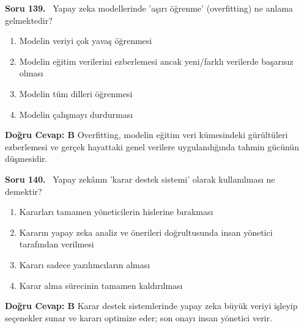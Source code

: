 \documentclass[11pt,a4paper,openany]{book}
\begin{document}
\needspace{5cm}
\vspace{8pt}
\noindent\textbf{\large\sffamily Soru 139.} \ Yapay zeka modellerinde 'aşırı öğrenme' (overfitting) ne anlama gelmektedir?
\begin{enumerate}[label=\Alph*), leftmargin=25pt, topsep=4pt, itemsep=2pt]
    \item Modelin veriyi çok yavaş öğrenmesi
    \item Modelin eğitim verilerini ezberlemesi ancak yeni/farklı verilerde başarısız olması
    \item Modelin tüm dilleri öğrenmesi
    \item Modelin çalışmayı durdurması
\end{enumerate}
\vspace{4pt}
\begin{tcolorbox}[title=Cevap ve Açıklama, colback=gray!3!white, colframe=primarycolor!90!black, arc=2mm, fonttitle=\bfseries\sffamily, top=6pt, bottom=6pt]
    \textbf{Doğru Cevap: B}
    \vspace{2pt}
    Overfitting, modelin eğitim veri kümesindeki gürültüleri ezberlemesi ve gerçek hayattaki genel verilere uygulandığında tahmin gücünün düşmesidir.
\end{tcolorbox}
\vspace{10pt}

\needspace{5cm}
\vspace{8pt}
\noindent\textbf{\large\sffamily Soru 140.} \ Yapay zekânın 'karar destek sistemi' olarak kullanılması ne demektir?
\begin{enumerate}[label=\Alph*), leftmargin=25pt, topsep=4pt, itemsep=2pt]
    \item Kararları tamamen yöneticilerin hislerine bırakması
    \item Kararın yapay zeka analiz ve önerileri doğrultusunda insan yönetici tarafından verilmesi
    \item Kararı sadece yazılımcıların alması
    \item Karar alma sürecinin tamamen kaldırılması
\end{enumerate}
\vspace{4pt}
\begin{tcolorbox}[title=Cevap ve Açıklama, colback=gray!3!white, colframe=primarycolor!90!black, arc=2mm, fonttitle=\bfseries\sffamily, top=6pt, bottom=6pt]
    \textbf{Doğru Cevap: B}
    \vspace{2pt}
    Karar destek sistemlerinde yapay zeka büyük veriyi işleyip seçenekler sunar ve kararı optimize eder; son onayı insan yönetici verir.
\end{tcolorbox}
\vspace{10pt}
\end{document}
